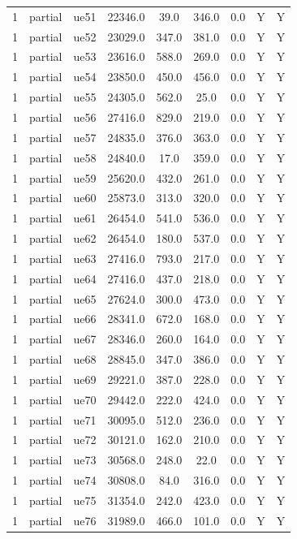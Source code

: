 \begin{table}[ht]
\begin{tabular}{|c|c|c|c|c|c|c|c|c|}
1 & partial & ue51 & 22346.0 & 39.0 & 346.0 & 0.0 & Y & Y \\
1 & partial & ue52 & 23029.0 & 347.0 & 381.0 & 0.0 & Y & Y \\
1 & partial & ue53 & 23616.0 & 588.0 & 269.0 & 0.0 & Y & Y \\
1 & partial & ue54 & 23850.0 & 450.0 & 456.0 & 0.0 & Y & Y \\
1 & partial & ue55 & 24305.0 & 562.0 & 25.0 & 0.0 & Y & Y \\
1 & partial & ue56 & 27416.0 & 829.0 & 219.0 & 0.0 & Y & Y \\
1 & partial & ue57 & 24835.0 & 376.0 & 363.0 & 0.0 & Y & Y \\
1 & partial & ue58 & 24840.0 & 17.0 & 359.0 & 0.0 & Y & Y \\
1 & partial & ue59 & 25620.0 & 432.0 & 261.0 & 0.0 & Y & Y \\
1 & partial & ue60 & 25873.0 & 313.0 & 320.0 & 0.0 & Y & Y \\
1 & partial & ue61 & 26454.0 & 541.0 & 536.0 & 0.0 & Y & Y \\
1 & partial & ue62 & 26454.0 & 180.0 & 537.0 & 0.0 & Y & Y \\
1 & partial & ue63 & 27416.0 & 793.0 & 217.0 & 0.0 & Y & Y \\
1 & partial & ue64 & 27416.0 & 437.0 & 218.0 & 0.0 & Y & Y \\
1 & partial & ue65 & 27624.0 & 300.0 & 473.0 & 0.0 & Y & Y \\
1 & partial & ue66 & 28341.0 & 672.0 & 168.0 & 0.0 & Y & Y \\
1 & partial & ue67 & 28346.0 & 260.0 & 164.0 & 0.0 & Y & Y \\
1 & partial & ue68 & 28845.0 & 347.0 & 386.0 & 0.0 & Y & Y \\
1 & partial & ue69 & 29221.0 & 387.0 & 228.0 & 0.0 & Y & Y \\
1 & partial & ue70 & 29442.0 & 222.0 & 424.0 & 0.0 & Y & Y \\
1 & partial & ue71 & 30095.0 & 512.0 & 236.0 & 0.0 & Y & Y \\
1 & partial & ue72 & 30121.0 & 162.0 & 210.0 & 0.0 & Y & Y \\
1 & partial & ue73 & 30568.0 & 248.0 & 22.0 & 0.0 & Y & Y \\
1 & partial & ue74 & 30808.0 & 84.0 & 316.0 & 0.0 & Y & Y \\
1 & partial & ue75 & 31354.0 & 242.0 & 423.0 & 0.0 & Y & Y \\
1 & partial & ue76 & 31989.0 & 466.0 & 101.0 & 0.0 & Y & Y \\

\end{tabular}
\end{table}
